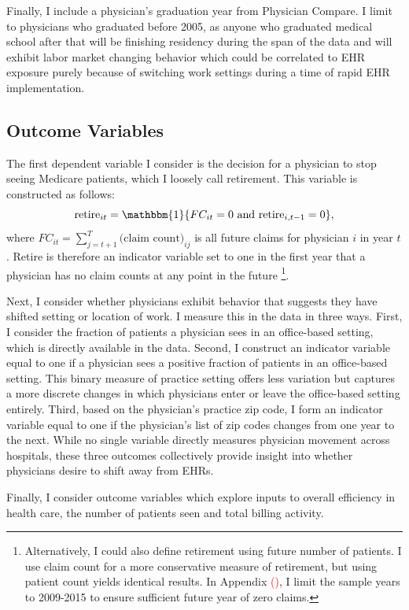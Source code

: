 \documentclass[11pt]{article}
\begin{document}
Finally, I include a physician's graduation year from Physician Compare. I limit to physicians who graduated before 2005, as anyone who graduated medical school after that will be finishing residency during the span of the data and will exhibit labor market changing behavior which could be correlated to EHR exposure purely because of switching work settings during a time of rapid EHR implementation.

\subsection{Outcome Variables}\label{sec:outcome}

The first dependent variable I consider is the decision for a physician to stop seeing Medicare patients, which I loosely call retirement. This variable is constructed as follows: 
$$\text{retire}_{it}=\mathbbm{1}\{FC_{it}=0 \text{ and retire}_{i,t-1}=0\}, $$
where $FC_{it}=\sum\limits_{j=t+1}^T\text{(claim count)}_{ij}$ is all future claims for physician $i$ in year $t$. Retire is therefore an indicator variable set to one in the first year that a physician has no claim counts at any point in the future \footnote{Alternatively, I could also define retirement using future number of patients. I use claim count for a more conservative measure of retirement, but using patient count yields identical results. In Appendix \textcolor{red}{()}, I limit the sample years to 2009-2015 to ensure sufficient future year of zero claims.}.

Next, I consider whether physicians exhibit behavior that suggests they have shifted setting or location of work. I measure this in the data in three ways. First, I consider the fraction of patients a physician sees in an office-based setting, which is directly available in the data. Second, I construct an indicator variable equal to one if a physician sees a positive fraction of patients in an office-based setting. This binary measure of practice setting offers less variation but captures a more discrete changes in which physicians enter or leave the office-based setting entirely. Third, based on the physician's practice zip code, I form an indicator variable equal to one if the physician's list of zip codes changes from one year to the next. While no single variable directly measures physician movement across hospitals, these three outcomes collectively provide insight into whether physicians desire to shift away from EHRs.

Finally, I consider outcome variables which explore inputs to overall efficiency in health care, the number of patients seen and total billing activity.
\end{document}
